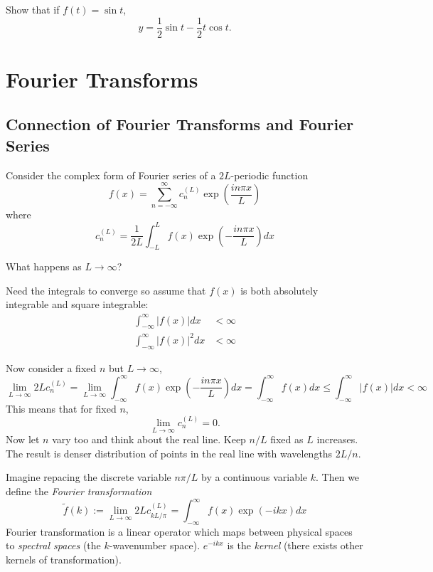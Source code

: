 \documentclass[a4paper]{article}
\newcommand*{\ft}{\tilde}
\begin{document}
\begin{ex}
  Show that if \(f(t) = \sin t\),
  \[
    y = \frac{1}{2} \sin t - \frac{1}{2} t\cos t.
  \]
\end{ex}

\section{Fourier Transforms}

\subsection{Connection of Fourier Transforms and Fourier Series}

Consider the complex form of Fourier series of a \(2L\)-periodic function
\[
  f(x) = \sum_{n = -\infty}^{\infty} c_n^{(L)} \exp ( \frac{in\pi x}{L} )
\]
where
\[
  c_n^{(L)} = \frac{1}{2L} \int_{-L}^{L} f(x) \exp (- \frac{in\pi x}{L}) dx
\]

\begin{question}
  What happens as \(L \to \infty\)?
\end{question}

Need the integrals to converge so assume that \(f(x)\) is both absolutely integrable and square integrable:
\begin{align*}
  \int_{-\infty}^{\infty} |f(x)| dx &< \infty \\
  \int_{-\infty}^{\infty} |f(x)|^2 dx &< \infty
\end{align*}

Now consider a fixed \(n\) but \(L \to \infty\),
\[
  \lim_{L \to \infty} 2L c_n^{(L)} = \lim_{L \to \infty} \int_{-\infty}^{\infty} f(x) \exp (-\frac{in\pi x}{L}) dx = \int_{-\infty}^{\infty} f(x) dx \leq \int_{-\infty}^{\infty} |f(x)| dx < \infty
\]
This means that for fixed \(n\),
\[
  \lim_{L \to \infty} c_n^{(L)} = 0.
\]
Now let \(n\) vary too and think about the real line. Keep \(n/L\) fixed as \(L\) increases. The result is denser distribution of points in the real line with wavelengths \(2L/n\).

Imagine repacing the discrete variable \(n\pi/L\) by a continuous variable \(k\). Then we define the \emph{Fourier transformation}
\[
  \ft f(k) := \lim_{L \to \infty} 2L c_{kL/\pi}^{(L)} = \int_{-\infty}^{\infty} f(x) \exp(-ikx) dx
\]
Fourier transformation is a linear operator which maps between physical spaces to \emph{spectral spaces} (the \(k\)-wavenumber space). \(e^{-ikx}\) is the \emph{kernel} (there exists other kernels of transformation).
\end{document}
